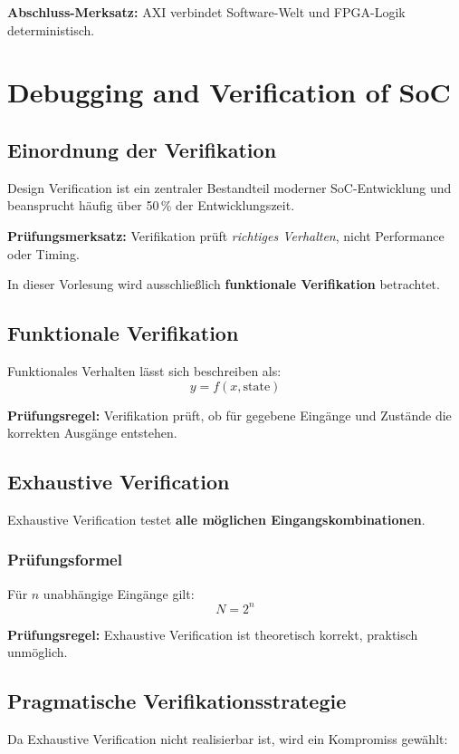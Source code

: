 \documentclass[11pt,a4paper]{article}
\newcommand{\hilite}[1]{\colorbox{yellow!25}{#1}}
\newcommand{\imp}[1]{\textbf{\textcolor{codeemph}{#1}}}
\begin{document}
\imp{Abschluss-Merksatz:}  
\hilite{AXI} \hilite{verbindet} \hilite{Software-Welt} und FPGA-Logik deterministisch.



\section{Debugging and Verification of SoC}

\subsection{Einordnung der Verifikation}
Design Verification ist ein zentraler Bestandteil moderner SoC-Entwicklung und beansprucht häufig über 50\,\% der Entwicklungszeit.

\imp{Prüfungsmerksatz:}  
\hilite{Verifikation} \hilite{prüft} \emph{richtiges Verhalten}, nicht Performance oder \hilite{Timing}.

In dieser Vorlesung wird ausschließlich \textbf{funktionale Verifikation} betrachtet.

\subsection{Funktionale Verifikation}
Funktionales Verhalten lässt sich beschreiben als:
\[
y = f(x, \text{state})
\]

\imp{Prüfungsregel:}  
\hilite{Verifikation} \hilite{prüft}, ob für \hilite{gegebene} Eingänge und Zustände die korrekten Ausgänge entstehen.

\subsection{Exhaustive Verification}
Exhaustive Verification testet \textbf{alle möglichen Eingangskombinationen}.

\subsubsection*{\textcolor{codeemph}{Prüfungsformel}}
Für $n$ unabhängige Eingänge gilt:
\[
N = 2^n
\]

\imp{Prüfungsregel:}  
\hilite{Exhaustive} \hilite{Verification} ist \hilite{theoretisch} korrekt, praktisch unmöglich.

\subsection{Pragmatische Verifikationsstrategie}
Da Exhaustive Verification nicht realisierbar ist, wird ein Kompromiss gewählt:
\end{document}
